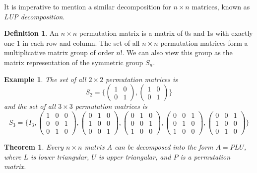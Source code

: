 \documentclass{article}
\newtheorem{theorem}{Theorem}[section]
\newtheorem{example}{Example}[section]
\theoremstyle{remark}
\theoremstyle{definition}
\newtheorem{definition}{Definition}[section]
\begin{document}
    It is imperative to mention a similar decomposition for $n \times n$ matrices, known as \textit{LUP decomposition}. 

    \begin{definition}
    An $n \times n$ permutation matrix is a matrix of $0$s and $1$s with exactly one $1$ in each row and column. The set of all $n \times n$ permutation matrices form a multiplicative matrix group of order $n!$. We can also view this group as the matrix representation of the symmetric group $S_n$. 
    \end{definition}

    \begin{example}
    The set of all $2 \times 2$ permutation matrices is 
    \[S_2 = \bigg\{  \begin{pmatrix}1 & 0 \\0 & 1 \end{pmatrix}, \begin{pmatrix}1 & 0 \\0 & 1 \end{pmatrix} \bigg\}\]
    and the set of all $3 \times 3$ permutation matrices is
    \[S_3 = \Bigg\{I_3, 
    \begin{pmatrix}1 & 0 & 0 \\0 & 0 & 1 \\0 & 1 & 0 \end{pmatrix},
    \begin{pmatrix}0 & 1 & 0 \\1 & 0 & 0 \\0 & 0 & 1 \end{pmatrix}, 
    \begin{pmatrix}0 & 1 & 0 \\0 & 0 & 1 \\1 & 0 & 0 \end{pmatrix}, 
    \begin{pmatrix}0 & 0 & 1 \\0 & 1 & 0 \\1 & 0 & 0 \end{pmatrix}, 
    \begin{pmatrix}0 & 0 & 1 \\1 & 0 & 0 \\0 & 1 & 0 \end{pmatrix} \Bigg\} \]
    \end{example}

    \begin{theorem}
    Every $n \times n$ matrix $A$ can be decomposed into the form $A = P L U$, where $L$ is lower triangular, $U$ is upper triangular, and $P$ is a permutation matrix. 
    \end{theorem}
\end{document}
